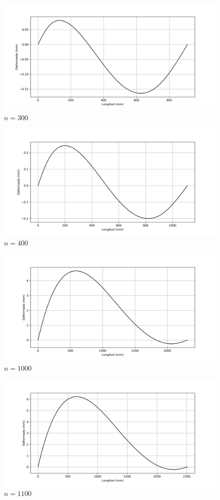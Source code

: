 \documentclass[a4paper,11pt]{report}
\begin{document}
\begin{figure}[H]
\centering
\includegraphics[scale=0.68]{defj300.png}
\caption{$n = 300$}
\end{figure}
\begin{figure}[H]
\centering
\includegraphics[scale=0.68]{defj400.png}
\caption{$n = 400$}
\end{figure}
\begin{figure}[H]
\centering
\includegraphics[scale=0.68]{defj1000.png}
\caption{$n = 1000$}
\end{figure}
\begin{figure}[H]
\centering
\includegraphics[scale=0.68]{defj1100.png}
\caption{$n = 1100$}
\end{figure}
\end{document}
